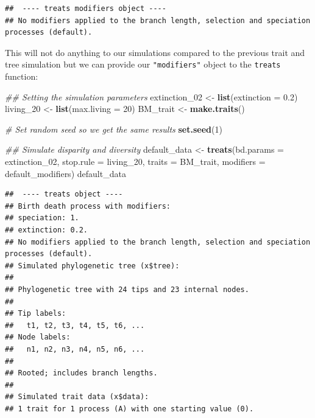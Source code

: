 \documentclass[
]{book}
\newenvironment{Shaded}{\begin{snugshade}}{\end{snugshade}}
\newcommand{\CommentTok}[1]{\textcolor[rgb]{0.56,0.35,0.01}{\textit{#1}}}
\newcommand{\DataTypeTok}[1]{\textcolor[rgb]{0.13,0.29,0.53}{#1}}
\newcommand{\DecValTok}[1]{\textcolor[rgb]{0.00,0.00,0.81}{#1}}
\newcommand{\FloatTok}[1]{\textcolor[rgb]{0.00,0.00,0.81}{#1}}
\newcommand{\KeywordTok}[1]{\textcolor[rgb]{0.13,0.29,0.53}{\textbf{#1}}}
\newcommand{\NormalTok}[1]{#1}
\newcommand{\StringTok}[1]{\textcolor[rgb]{0.31,0.60,0.02}{#1}}
\begin{document}
\begin{verbatim}
##  ---- treats modifiers object ---- 
## No modifiers applied to the branch length, selection and speciation processes (default).
\end{verbatim}

This will not do anything to our simulations compared to the previous trait and tree simulation but we can provide our \texttt{"modifiers"} object to the \texttt{treats} function:

\begin{Shaded}
\begin{Highlighting}[]
\CommentTok{\#\# Setting the simulation parameters}
\NormalTok{extinction\_}\DecValTok{02}\NormalTok{ \textless{}{-}}\StringTok{ }\KeywordTok{list}\NormalTok{(}\DataTypeTok{extinction =} \FloatTok{0.2}\NormalTok{)}
\NormalTok{living\_}\DecValTok{20}\NormalTok{     \textless{}{-}}\StringTok{ }\KeywordTok{list}\NormalTok{(}\DataTypeTok{max.living =} \DecValTok{20}\NormalTok{)}
\NormalTok{BM\_trait      \textless{}{-}}\StringTok{ }\KeywordTok{make.traits}\NormalTok{()}

\CommentTok{\# Set random seed so we get the same results}
\KeywordTok{set.seed}\NormalTok{(}\DecValTok{1}\NormalTok{)}

\CommentTok{\#\# Simulate disparity and diversity}
\NormalTok{default\_data \textless{}{-}}\StringTok{ }\KeywordTok{treats}\NormalTok{(}\DataTypeTok{bd.params =}\NormalTok{ extinction\_}\DecValTok{02}\NormalTok{,}
                     \DataTypeTok{stop.rule =}\NormalTok{ living\_}\DecValTok{20}\NormalTok{,}
                     \DataTypeTok{traits    =}\NormalTok{ BM\_trait,}
                     \DataTypeTok{modifiers =}\NormalTok{ default\_modifiers)}
\NormalTok{default\_data}
\end{Highlighting}
\end{Shaded}

\begin{verbatim}
##  ---- treats object ---- 
## Birth death process with modifiers:
## speciation: 1.
## extinction: 0.2.
## No modifiers applied to the branch length, selection and speciation processes (default).
## Simulated phylogenetic tree (x$tree):
## 
## Phylogenetic tree with 24 tips and 23 internal nodes.
## 
## Tip labels:
##   t1, t2, t3, t4, t5, t6, ...
## Node labels:
##   n1, n2, n3, n4, n5, n6, ...
## 
## Rooted; includes branch lengths.
## 
## Simulated trait data (x$data):
## 1 trait for 1 process (A) with one starting value (0).
\end{verbatim}
\end{document}
